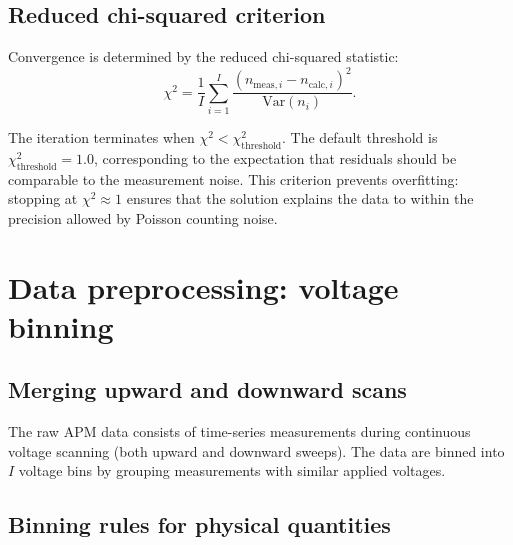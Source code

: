\documentclass[11pt,a4paper]{article}
\begin{document}
\subsection{Reduced chi-squared criterion}
\label{sec:chi-squared}

Convergence is determined by the reduced chi-squared statistic:
\begin{equation}
  \chi^{2} = \frac{1}{I} \sum_{i=1}^{I}
    \frac{\left(n_{\mathrm{meas},i} - n_{\mathrm{calc},i}\right)^{2}}
         {\mathrm{Var}(n_{i})}.
  \label{eq:chi-squared}
\end{equation}

The iteration terminates when
$\chi^{2} < \chi^{2}_{\mathrm{threshold}}$.  The default threshold is
$\chi^{2}_{\mathrm{threshold}} = 1.0$, corresponding to the expectation that
residuals should be comparable to the measurement noise.  This criterion
prevents overfitting: stopping at $\chi^{2} \approx 1$ ensures that the
solution explains the data to within the precision allowed by Poisson counting
noise.

\section{Data preprocessing: voltage binning}
\label{sec:preprocessing}

\subsection{Merging upward and downward scans}
\label{sec:scan-merge}

The raw APM data consists of time-series measurements during continuous
voltage scanning (both upward and downward sweeps).  The data are binned into
$I$ voltage bins by grouping measurements with similar applied voltages.

\subsection{Binning rules for physical quantities}
\label{sec:binning-rules}
\end{document}
